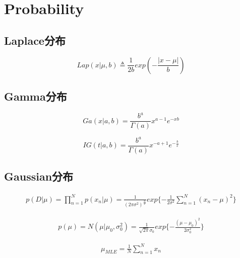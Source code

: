 \chapter{Probability}

\section{Laplace分布}
\begin{equation}
Lap(x|\mu, b) \triangleq \frac{1}{2b}
exp(-\frac{|x-\mu|}{b})
\end{equation}

\section{Gamma分布}

\begin{equation}
Ga(x|a, b) = \frac{b^a}{\Gamma (a)}x^{a-1}e^{-xb}
\end{equation}

\begin{equation}
IG(t|a, b) = \frac{b^a}{\Gamma (a)}x^{-a+1}e^{-\frac{b}{x}}
\end{equation}


\section{Gaussian分布}
\begin{equation}
\begin{aligned}
p(D|\mu) = \prod_{n=1}^Np(x_n|\mu) 
= \frac{1}{(2\pi \sigma^2)^{\frac{N}{2}}}
exp\{-\frac{1}{2\sigma^2}\sum_{n=1}^N(x_n-\mu)^2\}
\end{aligned}
\end{equation}

\begin{equation}
\begin{aligned}
p(\mu) = N(\mu|\mu_0, \sigma_0^2)
= \frac{1}{\sqrt{2\pi}\sigma_0}exp\{-\frac{(\mu-\mu_0)^2}{2\sigma_0^2}\}
\end{aligned}
\end{equation}

\begin{equation}
\begin{aligned}
\mu_{MLE} = \frac{1}{N} \sum_{n=1}^N{x_n}
\end{aligned}
\end{equation}

